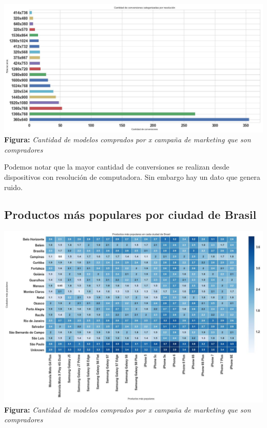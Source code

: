 \documentclass[titlepage,a4paper]{article}
\begin{document}
	\begin{center}
	\includegraphics[width=16cm]{conversionesRealizadasPorResolucion.jpg}\\
	\textbf{Figura:}  \textit{Cantidad de modelos comprados por \textit{x} campaña de marketing que son compradores}
	\end{center}
	
	Podemos notar que la mayor cantidad de conversiones se realizan desde dispositivos con resolución de computadora. Sin embargo hay un dato que genera ruido.
	
	\subsection{Productos más populares por ciudad de Brasil}
	
	\begin{center}
	\includegraphics[width=16cm]{productosMasVisitadosPorCiudadDeBrasil.jpg}\\
	\textbf{Figura:}  \textit{Cantidad de modelos comprados por \textit{x} campaña de marketing que son compradores}
	\end{center}
	
\end{document}
